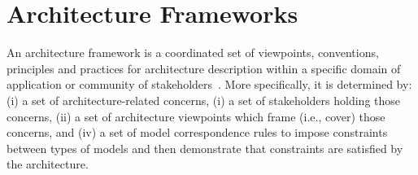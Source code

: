 \section{Architecture Frameworks}\label{sec:AAF}



An architecture framework is a
coordinated set of viewpoints, conventions, principles and practices
for architecture description within a specific domain of application
or community of stakeholders~\cite{42010}.  More specifically, it is determined by: (i) a set of architecture-related concerns,
(i) a set of stakeholders holding those concerns, (ii) a set of architecture viewpoints which frame (i.e.,
cover) those concerns, and (iv) a set of model correspondence rules to impose constraints between
types of models and then demonstrate that constraints
are satisfied by the architecture. 


%

